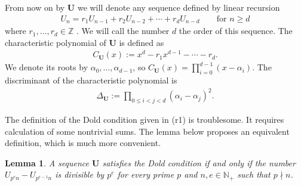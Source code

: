 \documentclass[preprint,12pt]{elsarticle}
\newcommand{\N}{\mathbb{N}}
\newcommand{\Z}{\mathbb{Z}}
\newcommand{\alphas}{\alpha_0,\ldots,\alpha_{d-1}}
\newtheorem{lemma}{Lemma}
\begin{document}
From now on by $\mathbf U$ we will denote any sequence defined by linear recursion
\begin{align} \label{def_Un} \tag{d1}
    U_n = r_1U_{n-1}+ r_2U_{n-2} + \cdots + r_d U_{n-d} 
    \quad\quad \text{for $n\geqslant d$}
\end{align}
where $r_1,\ldots,r_d\in \Z$ . We will call the number $d$ the order of this sequence. The characteristic polynomial of $\mathbf U$ is defined as 
\begin{align}\label{def_Char} \tag{d2}
    C_{\mathbf U}(x) := x^d - r_1x^{d-1} - \cdots - r_d.
\end{align}
We denote its roots by $\alphas$, so $ C_{\mathbf U}(x) = \prod_{i=0}^{d-1}(x-\alpha_i)$. The discriminant of the characteristic polynomial is
\begin{align}\label{def_Delta} \tag{d3}
    \Delta_{\mathbf U} := \prod_{0\leqslant i < j < d} (\alpha_i-\alpha_j)^2.
\end{align}




The definition of the Dold condition given in (r1) is troublesome. It requires calculation of some nontrivial sums. The lemma below proposes an equivalent definition, which is much more convenient.


\begin{lemma} \label{lem_betterDef}
    A sequence $\mathbf U$ satisfies the Dold condition if and only if  the number $U_{p^en} - U_{p^{e-1}n}$ is divisible by $p^e$ for every prime $p$ and $n, e \in\N_+$ such that $p\nmid n$.
\end{lemma}
  
\end{document}
